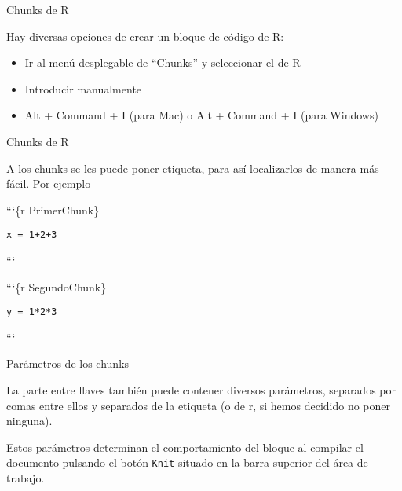 \documentclass[ignorenonframetext,]{beamer}
\providecommand{\tightlist}{%
  \setlength{\itemsep}{0pt}\setlength{\parskip}{0pt}}
\begin{document}
\begin{frame}{Chunks de R}
\protect\hypertarget{chunks-de-r-1}{}

Hay diversas opciones de crear un bloque de código de R:

\begin{itemize}
\tightlist
\item
  Ir al menú desplegable de ``Chunks'' y seleccionar el de R
\item
  Introducir manualmente
\item
  Alt + Command + I (para Mac) o Alt + Command + I (para Windows)
\end{itemize}

\end{frame}

\begin{frame}[fragile]{Chunks de R}
\protect\hypertarget{chunks-de-r-2}{}

A los chunks se les puede poner etiqueta, para así localizarlos de
manera más fácil. Por ejemplo

```\{r PrimerChunk\}

\texttt{x\ =\ 1+2+3}

```

\n

```\{r SegundoChunk\}

\texttt{y\ =\ 1*2*3}

```

\end{frame}

\begin{frame}[fragile]{Parámetros de los chunks}
\protect\hypertarget{parametros-de-los-chunks}{}

La parte entre llaves también puede contener diversos parámetros,
separados por comas entre ellos y separados de la etiqueta (o de r, si
hemos decidido no poner ninguna).

Estos parámetros determinan el comportamiento del bloque al compilar el
documento pulsando el botón \texttt{Knit} situado en la barra superior
del área de trabajo.

\end{frame}
\end{document}
